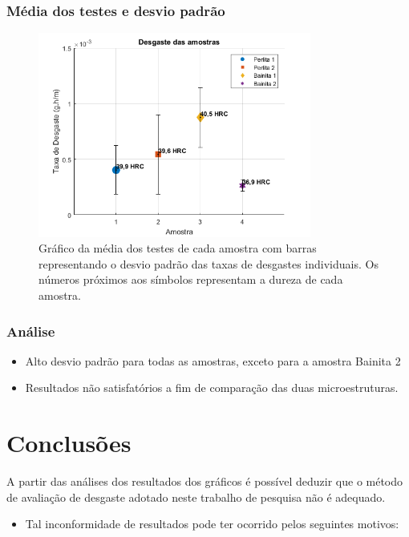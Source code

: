 \documentclass{beamer}
\begin{document}
\begin{frame}
\frametitle{Média dos testes e desvio padrão}
\begin{figure}
	\centering
	\includegraphics[width=0.8\textwidth]{graf2}
	\caption{Gráfico da média dos testes de cada amostra com barras representando o desvio padrão das taxas de desgastes individuais. Os números próximos aos símbolos representam a dureza de cada amostra.}
	\label{fig:graf2}
\end{figure}
\end{frame}

\begin{frame}
\frametitle{Análise}
\begin{itemize}
	\item Alto desvio padrão para todas as amostras, exceto para a amostra Bainita 2
	\item Resultados não satisfatórios a fim de comparação das duas microestruturas.
\end{itemize}

\end{frame}

\section{Conclusões}


\begin{frame}
	A partir das análises dos resultados dos gráficos é possível deduzir que o método de avaliação de desgaste adotado neste trabalho de pesquisa não é adequado. 
\begin{itemize}
	\item Tal inconformidade de resultados pode ter ocorrido pelos seguintes motivos:
\end{itemize}

\end{frame}
\end{document}
